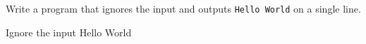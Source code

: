 




Write a program that ignores the input and outputs \texttt{Hello World} on a single line.

\vstup
Ignore the input
\vystup
Hello World
\koniec


